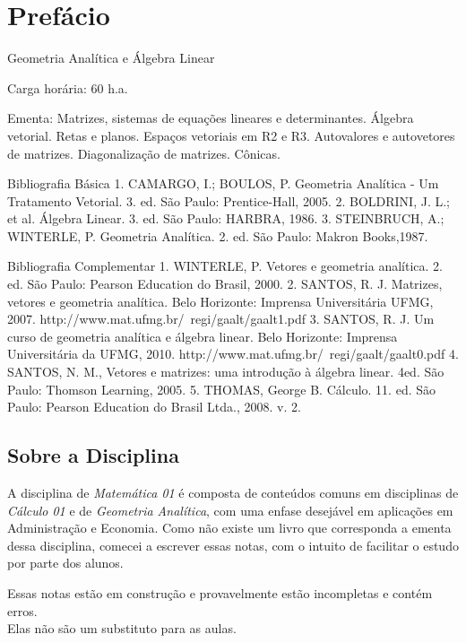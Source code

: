\chapter*{Prefácio}

Geometria Analítica e Álgebra Linear

Carga horária: 60 h.a.

Ementa: Matrizes, sistemas de equações lineares e determinantes. Álgebra vetorial. Retas e planos. Espaços vetoriais em R2 e R3. Autovalores e autovetores de matrizes. Diagonalização de matrizes. Cônicas.

Bibliografia Básica
1. CAMARGO, I.; BOULOS, P. Geometria Analítica - Um Tratamento Vetorial. 3. ed. São Paulo: Prentice-Hall, 2005.
2. BOLDRINI, J. L.; et al. Álgebra Linear. 3. ed. São Paulo: HARBRA, 1986.
3. STEINBRUCH, A.; WINTERLE, P. Geometria Analítica. 2. ed. São Paulo: Makron Books,1987.

Bibliografia Complementar
1. WINTERLE, P. Vetores e geometria analítica. 2. ed. São Paulo: Pearson Education do Brasil, 2000.
2. SANTOS, R. J. Matrizes, vetores e geometria analítica. Belo Horizonte: Imprensa Universitária UFMG, 2007. http://www.mat.ufmg.br/~regi/gaalt/gaalt1.pdf
3. SANTOS, R. J. Um curso de geometria analítica e álgebra linear. Belo Horizonte: Imprensa Universitária da UFMG, 2010. http://www.mat.ufmg.br/~regi/gaalt/gaalt0.pdf
4. SANTOS, N. M., Vetores e matrizes: uma introdução à álgebra linear. 4ed. São Paulo: Thomson Learning, 2005.
5. THOMAS, George B. Cálculo. 11. ed. São Paulo: Pearson Education do Brasil Ltda., 2008. v. 2.

\section*{Sobre a Disciplina}

A disciplina de \emph{Matemática 01} é composta de conteúdos comuns em disciplinas de \emph{Cálculo 01} e
de \emph{Geometria Analítica}, com uma enfase desejável em aplicações em Administração e Economia.
Como não existe um livro que corresponda a ementa dessa disciplina, comecei a escrever essas notas,
com o intuito de facilitar o estudo por parte dos alunos.

\begin{observation}
    Essas notas estão em construção e provavelmente estão incompletas e contém erros. \\
    Elas não são um substituto para as aulas.
\end{observation}

